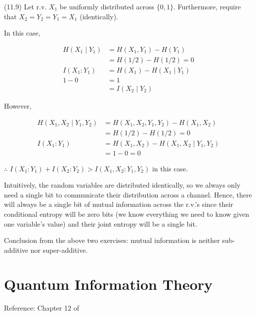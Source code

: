 \documentclass[main.tex]{subfiles}
\begin{document}
\begin{subappendices}
\begin{exercise}(11.9) Let r.v. $X_1$ be uniformly distributed across $\{ 0, 1\}$. Furthermore, require that $X_2 = Y_2 = Y_1 = X_1$ (identically). 

In this case,

\begin{align*}
	H(X_1 \mid Y_1 ) &= H(X_1, Y_1) - H(Y_1) \\
	&= H(1/2) - H(1/2) = 0 \\
	I(X_1 : Y_1) &= H(X_1) - H(X_1 \mid Y_1) \\
	1 - 0 &= 1 \\
	&= I(X_2 \mid Y_2)
\end{align*}

However,

\begin{align*}
	H(X_1, X_2 \mid Y_1, Y_2 ) &= H(X_1, X_2, Y_1, Y_2) - H(X_1, X_2) \\
	&= H(1/2) - H(1/2) = 0 \\
	I(X_1 : Y_1) &= H(X_1, X_2) - H(X_1, X_2 \mid Y_1, Y_2) \\
	&= 1 - 0 = 0
\end{align*}

$\therefore$ $I(X_1 : Y_1) + I(X_2 : Y_2) > I(X_1, X_2 : Y_1, Y_2)$ in this case.

Intuitively, the random variables are distributed identically, so we always only need a single bit to communicate their distribution across a channel. Hence, there will always be a single bit of mutual information across the r.v.'s since their conditional entropy will be zero bits (we know everything we need to know given one variable's value) and their joint entropy will be a single bit.
\end{exercise}


Conclusion from the above two exercises: mutual information is neither sub-additive nor super-additive.

\end{subappendices}

\section{Quantum Information Theory}
Reference: Chapter 12 of \cite{nielsen2010quantum}
\end{document}
